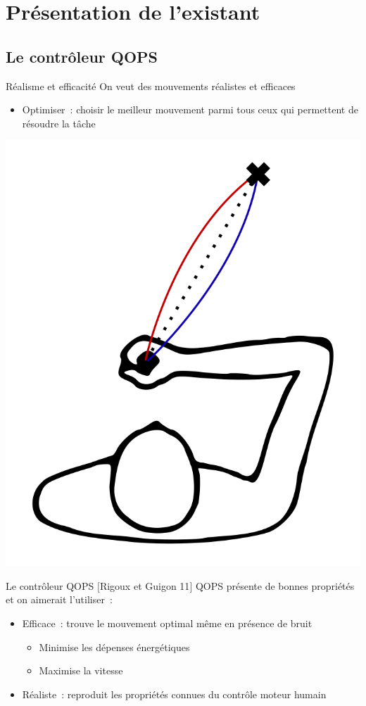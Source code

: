 \section{Présentation de l'existant}

\subsection{Le contrôleur QOPS}

\begin{frame}{Réalisme et efficacité}
    On veut des mouvements réalistes et efficaces
    \begin{itemize}
        \item Optimiser~: choisir le \og{}meilleur\fg{} mouvement parmi tous ceux qui permettent de résoudre la tâche
    \end{itemize}
    \begin{center}
        \includegraphics[width=.35\linewidth]{fig/paths}
    \end{center}
\end{frame}

\begin{frame}{Le contrôleur QOPS $[$Rigoux et Guigon 11$]$}
    QOPS présente de bonnes propriétés et on aimerait l'utiliser~:
    \begin{itemize}
        \item Efficace~: trouve le mouvement optimal même en présence de bruit
        \begin{itemize}
            \item Minimise les dépenses énergétiques
            \item Maximise la vitesse
        \end{itemize}
        \item Réaliste~: reproduit les propriétés connues du contrôle moteur humain
    \end{itemize}
\end{frame}

